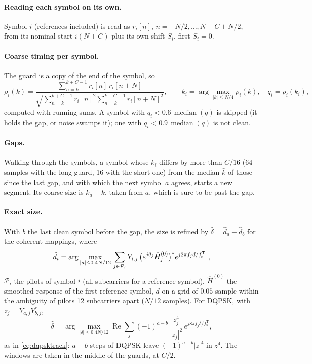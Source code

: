 \documentclass[11pt,a4paper]{article}
\newcommand{\fsT}{f_{\mathrm{s}}^{\mathrm{T}}}
\theoremstyle{remark}
\begin{document}
\paragraph{Reading each symbol on its own.} Symbol $i$ (references included) is read as $r_i[n]$, $n = -N/2, \dots, N + C + N/2$, from its nominal start $i(N + C)$ plus its own shift $S_i$, first $S_i = 0$.

\paragraph{Coarse timing per symbol.} The guard is a copy of the end of the symbol, so
\begin{equation}
\rho_i(k) = \frac{\sum_{n=k}^{k+C-1} r_i[n]\, r_i[n+N]}{\sqrt{\sum_{n=k}^{k+C-1} r_i[n]^2 \sum_{n=k}^{k+C-1} r_i[n+N]^2}}, \qquad k_i = \arg\max_{|k| \le N/4} \rho_i(k), \quad q_i = \rho_i(k_i),
\end{equation}
computed with running sums. A symbol with $q_i < 0.6\,\operatorname{median}(q)$ is skipped (it holds the gap, or noise swamps it); one with $q_i < 0.9\,\operatorname{median}(q)$ is not clean.

\paragraph{Gaps.} Walking through the symbols, a symbol whose $k_i$ differs by more than $C/16$ (64 samples with the long guard, 16 with the short one) from the median $\bar k$ of those since the last gap, and with which the next symbol $a$ agrees, starts a new segment. Its coarse size is $k_a - \bar k$, taken from $a$, which is sure to be past the gap.

\paragraph{Exact size.} With $b$ the last clean symbol before the gap, the size is refined by $\hat\delta = \hat d_a - \hat d_b$ for the coherent mappings, where
\begin{equation}
\hat d_i = \arg\max_{|d| \le 0.4 N/12} \Bigl|\sum_{j \in \mathcal P_i} Y_{i,j}\, \bigl(e^{j\theta_j} \hat H^{(0)}_j\bigr)^{*} e^{j 2\pi f_j d/\fsT}\Bigr|,
\end{equation}
$\mathcal P_i$ the pilots of symbol $i$ (all subcarriers for a reference symbol), $\hat H^{(0)}$ the smoothed response of the first reference symbol, $d$ on a grid of $0.05$ sample within the ambiguity of pilots 12 subcarriers apart ($N/12$ samples). For DQPSK, with $z_j = Y_{a,j} Y_{b,j}^*$,
\begin{equation}
\hat\delta = \arg\max_{|\delta| \le 0.4 N/12} \operatorname{Re} \sum_j (-1)^{a-b}\, \frac{z_j^4}{|z_j|^2}\, e^{j 8\pi f_j \delta/\fsT},
\end{equation}
as in \cref{eq:dqpsktrack}: $a - b$ steps of DQPSK leave $(-1)^{a-b}|z|^4$ in $z^4$. The windows are taken in the middle of the guards, at $C/2$.
\end{document}
